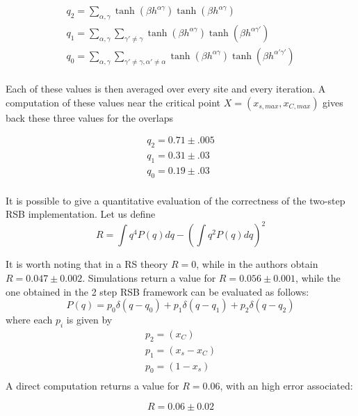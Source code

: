 \begin{eqnarray}
	q_2 = \sum_{\alpha, \gamma } \tanh(\beta h^{\alpha\gamma})\tanh(\beta h^{\alpha\gamma})  \\
	q_1 = \sum_{\alpha, \gamma} \sum_{\gamma' \neq \gamma } \tanh(\beta h^{\alpha\gamma})\tanh(\beta h^{\alpha\gamma'})  \\
	q_0 = \sum_{\alpha, \gamma} \sum_{\gamma' \neq \gamma, \alpha' \neq \alpha} \tanh(\beta h^{\alpha\gamma})\tanh(\beta h^{\alpha'\gamma'})  \\
\end{eqnarray}

Each of these values is then averaged over every site and every iteration.
A computation of these values near the critical point $X = (x_{s,max},x_{C,max})$ gives back these three values for the overlaps

\begin{eqnarray}
	q_2 = 0.71 \pm .005\nonumber \\
	q_1 = 0.31 \pm .03 \nonumber \\
	q_0 = 0.19 \pm .03 \nonumber \\
\end{eqnarray}

It is possible to give a quantitative evaluation of the correctness of the two-step RSB implementation. Let us define
\begin{equation}
R = \int q^4 P(q)dq - (\int q^2P(q)dq)^2
\label{erre}
\end{equation}

It is worth noting that in a RS theory $R=0$, while in \cite{bethe} the authors obtain $R = 0.047 \pm 0.002$. Simulations return a value for $R=0.056 \pm 0.001$, while the one obtained in the 2 step RSB framework can be evaluated as follows:
\begin{equation}
P(q) = p_0 \delta(q-q_0) + p_1 \delta(q-q_1) + p_2 \delta(q-q_2)
\end{equation}
where each $p_i$ is given by
\begin{eqnarray}
p_2 = (x_C) \nonumber \\
p_1 = (x_s - x_C) \nonumber \\
p_0 = (1 -  x_s)  \nonumber \\
\end{eqnarray}
A direct computation returns a value for $R =0.06$, with an high error associated:

\begin{equation}
                        R =0.06 \pm 0.02
\end{equation}

